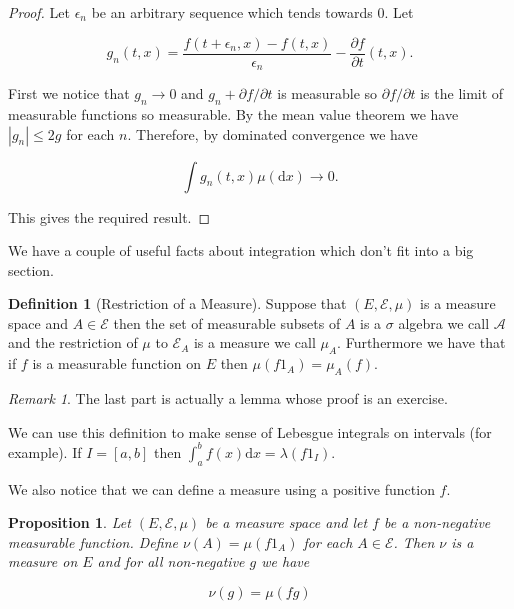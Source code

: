 \documentclass[
]{book}
\newtheorem{proposition}{Proposition}[chapter]
\theoremstyle{definition}
\newtheorem{definition}{Definition}[chapter]
\theoremstyle{definition}
\theoremstyle{definition}
\theoremstyle{definition}
\theoremstyle{remark}
\newtheorem*{remark}{Remark}
\begin{document}
\begin{proof}
Let \(\epsilon_n\) be an arbitrary sequence which tends towards \(0\). Let

\[ g_n(t,x) = \frac{f(t+\epsilon_n,x) - f(t,x)}{\epsilon_n} - \frac{\partial f}{\partial t}(t,x). \]

First we notice that \(g_n \rightarrow 0\) and \(g_n + \partial f/\partial t\) is measurable so \(\partial f/ \partial t\) is the limit of measurable functions so measurable. By the mean value theorem we have \(|g_n| \leq 2g\) for each \(n\). Therefore, by dominated convergence we have

\[ \int g_n(t,x) \mu(\mathrm{d}x) \rightarrow 0.  \]

This gives the required result.
\end{proof}

We have a couple of useful facts about integration which don't fit into a big section.

\begin{definition}[Restriction of a Measure]
Suppose that \((E, \mathcal{E}, \mu)\) is a measure space and \(A \in \mathcal{E}\) then the set of measurable subsets of \(A\) is a \(\sigma\) algebra we call \(\mathcal{A}\) and the restriction of \(\mu\) to \(\mathcal{E}_A\) is a measure we call \(\mu_A\). Furthermore we have that if \(f\) is a measurable function on \(E\) then \(\mu(f1_A) = \mu_A(f)\).
\end{definition}

\begin{remark}
The last part is actually a lemma whose proof is an exercise.
\end{remark}

We can use this definition to make sense of Lebesgue integrals on intervals (for example). If \(I= [a,b]\) then \(\int_a^b f(x) \mathrm{d}x = \lambda(f1_I)\).

We also notice that we can define a measure using a positive function \(f\).

\begin{proposition}
Let \((E, \mathcal{E}, \mu)\) be a measure space and let \(f\) be a non-negative measurable function. Define \(\nu(A) = \mu(f1_A)\) for each \(A \in \mathcal{E}\). Then \(\nu\) is a measure on \(E\) and for all non-negative \(g\) we have

\[ \nu(g) = \mu(fg) \]
\end{proposition}
\end{document}
